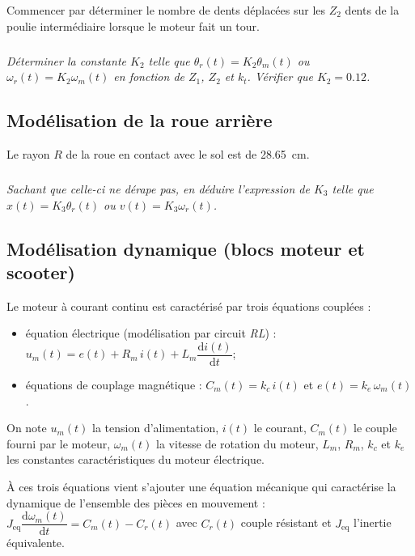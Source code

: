 \documentclass[10pt,fleqn]{article} %
\begin{document}
\begin{multicols}{2}
\begin{methode}
Commencer par déterminer le nombre de dents déplacées sur les $Z_2$ dents de la poulie intermédiaire lorsque le moteur fait un tour.
\end{methode}



\subparagraph{}\textit{Déterminer la constante $K_2$ telle que $\theta_r(t)=K_2\theta_m(t)$  ou $\omega_r(t)=K_2\omega_m(t)$ en fonction de $Z_{1}$, $Z_{2}$  et $k_t$. Vérifier que $K_2=\num{0.12}$.}


\subsection*{Modélisation de la roue arrière}
Le rayon $R$ de la roue en contact avec le sol est de \SI{28.65}{cm}. 

\subparagraph{}\textit{Sachant que celle-ci ne dérape pas, en déduire l'expression de $K_3$ telle que $x(t)=K_3\theta_r(t)$ ou $v(t)=K_3\omega_r(t)$.}



\subsection*{Modélisation dynamique (blocs moteur et scooter)}
Le moteur à courant continu est caractérisé par trois équations couplées :
\begin{itemize}
\item équation électrique (modélisation par circuit \textit{RL}) : $u_m(t)=e(t)+R_m\, i(t)+L_m\dfrac{\text{d}i(t)}{\text{d}t}$;
\item équations de couplage magnétique : $C_m(t)=k_c\,i(t)$ et $e(t)=k_e\,\omega_m(t)$.
\end{itemize}
On note $u_m(t)$ la tension d'alimentation, $i(t)$ le courant, $C_m(t)$ le couple fourni par le moteur, $\omega_m(t)$ la vitesse de rotation du moteur, $L_m$, $R_m$, $k_c$ et $k_e$ les constantes caractéristiques du moteur électrique.

\`A ces trois équations vient s'ajouter une équation mécanique qui caractérise la dynamique de l'ensemble des pièces en mouvement : $J_{\text{eq}}\dfrac{\text{d}\omega_m(t)}{\text{d}t}=C_m(t) - C_r(t)$  avec $C_r(t)$ couple résistant et $J_{\text{eq}}$  l'inertie équivalente.


\end{multicols}
\end{document}
